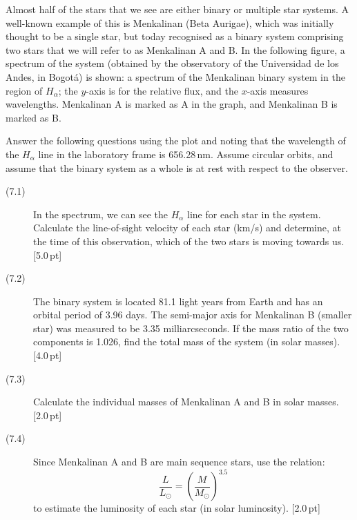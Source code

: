 Almost half of the stars that we see are either binary or multiple star
systems. A well-known example of this is Menkalinan (Beta Aurigae), which was
initially thought to be a single star, but today recognised as a binary
system comprising two stars that we will refer to as Menkalinan A and B. In
the following figure, a spectrum of the system (obtained by the observatory
of the Universidad de los Andes, in Bogot\'a) is shown: a spectrum of the
Menkalinan binary system in the region of $H_\alpha$; the $y$-axis is for the
relative flux, and the $x$-axis measures wavelengths. Menkalinan A is marked
as A in the graph, and Menkalinan B is marked as B.

Answer the following questions using the plot and noting that the wavelength
of the $H_\alpha$ line in the laboratory frame is 656.28\,nm. Assume circular
orbits, and assume that the binary system as a whole is at rest with respect
to the observer.

\begin{description}
\item[(7.1)] In the spectrum, we can see the $H_\alpha$ line for each star
  in the system. Calculate the line-of-sight velocity of each star (km/s)
  and determine, at the time of this observation, which of the two stars is
  moving towards us. \hfill[5.0\,pt]
\item[(7.2)] The binary system is located 81.1 light years from Earth and
  has an orbital period of 3.96 days. The semi-major axis for Menkalinan B
  (smaller star) was measured to be 3.35 milliarcseconds. If the mass ratio
  of the two components is 1.026, find the total mass of the system (in
  solar masses). \hfill[4.0\,pt]
\item[(7.3)] Calculate the individual masses of Menkalinan A and B in solar
  masses. \hfill[2.0\,pt]
\item[(7.4)] Since Menkalinan A and B are main sequence stars, use the
  relation:
  \[ \frac{L}{L_\odot} = \left(\frac{M}{M_\odot}\right)^{3.5} \]
  to estimate the luminosity of each star (in solar luminosity).
  \hfill[2.0\,pt]
\end{description}
